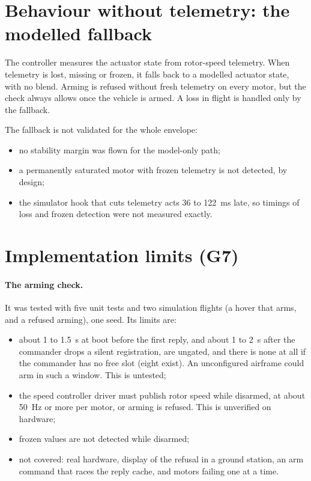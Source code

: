 \section{Behaviour without telemetry: the modelled fallback}\label{sec:lim_fallback}

The controller measures the actuator state from rotor-speed telemetry.
When telemetry is lost, missing or frozen, it falls back to a modelled actuator state, with no blend.
Arming is refused without fresh telemetry on every motor, but the check always allows once the vehicle is armed.
A loss in flight is handled only by the fallback.

The fallback is not validated for the whole envelope:
\begin{itemize}
  \item no stability margin was flown for the model-only path;
  \item a permanently saturated motor with frozen telemetry is not detected, by design;
  \item the simulator hook that cuts telemetry acts 36 to 122~ms late, so timings of loss and frozen detection were not measured exactly.
\end{itemize}

\section{Implementation limits (G7)}\label{sec:lim_impl}

\paragraph{The arming check.}
It was tested with five unit tests and two simulation flights (a hover that arms, and a refused arming), one seed.
Its limits are:
\begin{itemize}
  \item about 1 to 1.5~s at boot before the first reply, and about 1 to 2~s after the commander drops a silent registration, are ungated, and there is none at all if the commander has no free slot (eight exist). An unconfigured airframe could arm in such a window. This is untested;
  \item the speed controller driver must publish rotor speed while disarmed, at about 50~Hz or more per motor, or arming is refused. This is unverified on hardware;
  \item frozen values are not detected while disarmed;
  \item not covered: real hardware, display of the refusal in a ground station, an arm command that races the reply cache, and motors failing one at a time.
\end{itemize}

